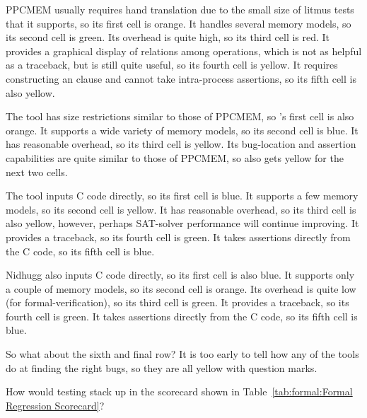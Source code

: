 PPCMEM usually requires hand translation due to the small size of litmus
tests that it supports, so its first cell is orange.
It handles several memory models, so its second cell is green.
Its overhead is quite high, so its third cell is red.
It provides a graphical display of relations among operations, which
is not as helpful as a traceback, but is still quite useful, so its
fourth cell is yellow.
It requires constructing an  clause and cannot take
intra-process assertions, so its fifth cell is also yellow.

The  tool has size restrictions similar to those of PPCMEM,
so 's first cell is also orange.
It supports a wide variety of memory models, so its second cell is blue.
It has reasonable overhead, so its third cell is yellow.
Its bug-location and assertion capabilities are quite similar to those
of PPCMEM, so  also gets yellow for the next two cells.

The  tool inputs C code directly, so its first cell is blue.
It supports a few memory models, so its second cell is yellow.
It has reasonable overhead, so its third cell is also yellow, however,
perhaps SAT-solver performance will continue improving.
It provides a traceback, so its fourth cell is green.
It takes assertions directly from the C code, so its fifth cell is blue.

Nidhugg also inputs C code directly, so its first cell is also blue.
It supports only a couple of memory models, so its second cell is orange.
Its overhead is quite low (for formal-verification), so its
third cell is green.
It provides a traceback, so its fourth cell is green.
It takes assertions directly from the C code, so its fifth cell is blue.

So what about the sixth and final row?
It is too early to tell how any of the tools do at finding the right bugs,
so they are all yellow with question marks.

\QuickQuiz{}
	How would testing stack up in the scorecard shown in
	Table~\ref{tab:formal:Formal Regression Scorecard}?
 \QuickQuizEnd

